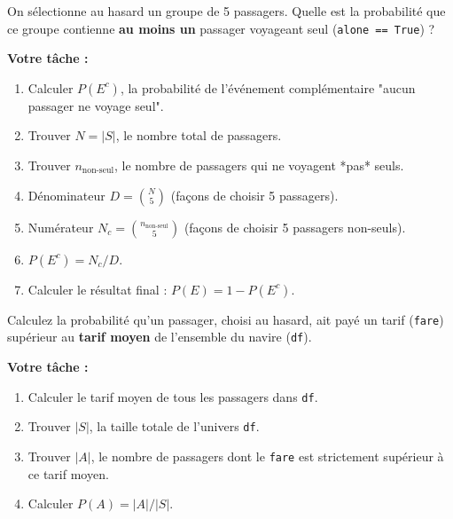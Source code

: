 \begin{exercicebox}
On sélectionne au hasard un groupe de 5 passagers. Quelle est la probabilité que ce groupe contienne \textbf{au moins un} passager voyageant seul (\texttt{alone == True}) ?

\textbf{Votre tâche :}
\begin{enumerate}
    \item Calculer $P(E^c)$, la probabilité de l'événement complémentaire "aucun passager ne voyage seul".
    \item Trouver $N = |S|$, le nombre total de passagers.
    \item Trouver $n_{\text{non-seul}}$, le nombre de passagers qui ne voyagent *pas* seuls.
    \item Dénominateur $D = \binom{N}{5}$ (façons de choisir 5 passagers).
    \item Numérateur $N_c = \binom{n_{\text{non-seul}}}{5}$ (façons de choisir 5 passagers non-seuls).
    \item $P(E^c) = N_c / D$.
    \item Calculer le résultat final : $P(E) = 1 - P(E^c)$.
\end{enumerate}
\end{exercicebox}

\begin{exercicebox}
Calculez la probabilité qu'un passager, choisi au hasard, ait payé un tarif (\texttt{fare}) supérieur au \textbf{tarif moyen} de l'ensemble du navire (\texttt{df}).

\textbf{Votre tâche :}
\begin{enumerate}
    \item Calculer le tarif moyen de tous les passagers dans \texttt{df}.
    \item Trouver $|S|$, la taille totale de l'univers \texttt{df}.
    \item Trouver $|A|$, le nombre de passagers dont le \texttt{fare} est strictement supérieur à ce tarif moyen.
    \item Calculer $P(A) = |A| / |S|$.
\end{enumerate}
\end{exercicebox}

